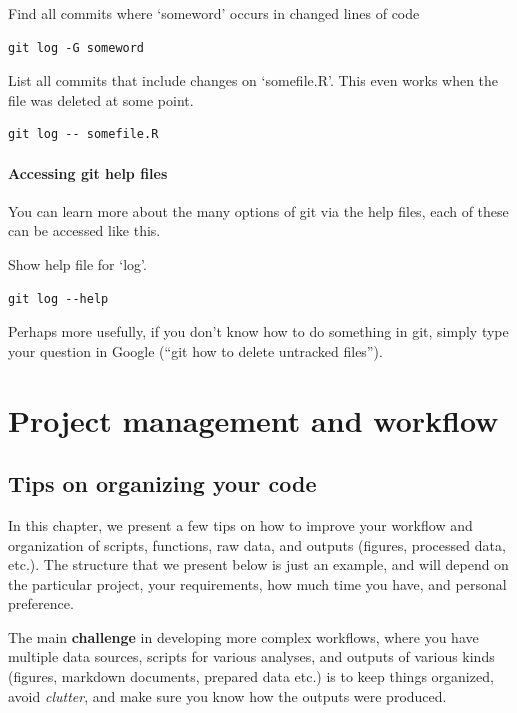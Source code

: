 \documentclass[]{book}
\begin{document}
Find all commits where `someword' occurs in changed lines of code

\begin{verbatim}
git log -G someword
\end{verbatim}

List all commits that include changes on `somefile.R'. This even works when the file was deleted at some point.

\begin{verbatim}
git log -- somefile.R
\end{verbatim}

\hypertarget{accessing-git-help-files}{%
\subsubsection{Accessing git help files}\label{accessing-git-help-files}}

You can learn more about the many options of git via the help files, each of these can be accessed like this.

Show help file for `log'.

\begin{verbatim}
git log --help
\end{verbatim}

Perhaps more usefully, if you don't know how to do something in git, simply type your question in Google (``git how to delete untracked files'').

\hypertarget{projectman}{%
\chapter{Project management and workflow}\label{projectman}}

\hypertarget{tips-on-organizing-your-code}{%
\section{Tips on organizing your code}\label{tips-on-organizing-your-code}}

In this chapter, we present a few tips on how to improve your workflow and organization of scripts, functions, raw data, and outputs (figures, processed data, etc.). The structure that we present below is just an example, and will depend on the particular project, your requirements, how much time you have, and personal preference.

The main \textbf{challenge} in developing more complex workflows, where you have multiple data sources, scripts for various analyses, and outputs of various kinds (figures, markdown documents, prepared data etc.) is to keep things organized, avoid \emph{clutter}, and make sure you know how the outputs were produced.
\end{document}
